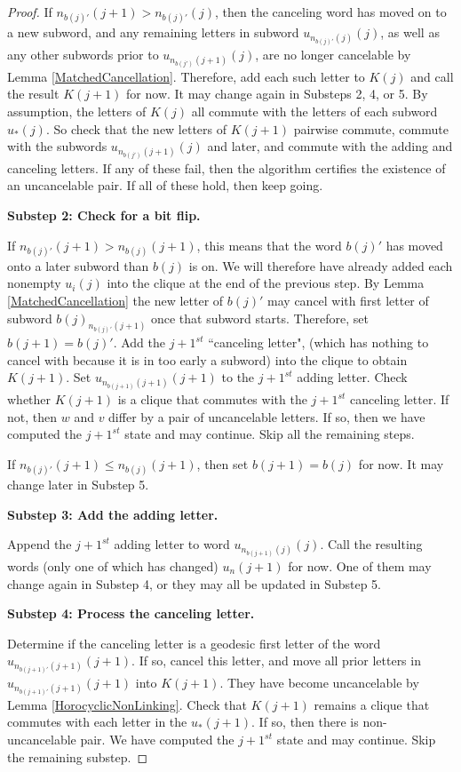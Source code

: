 \documentclass{amsart}
\theoremstyle{definition}
\theoremstyle{remark}
\begin{document}
\begin{proof}
		If $n_{b(j)'}(j+1)>n_{b(j)'}(j)$, then the canceling word has moved on to a new subword, and any remaining letters in subword $u_{n_{b(j)'}(j)}(j)$, as well as any other subwords prior to $u_{n_{b(j')}(j+1)}(j)$, are no longer cancelable by Lemma \ref{MatchedCancellation}. Therefore, add each such letter to $K(j)$ and call the result $K(j+1)$ for now. It may change again in Substeps 2, 4, or 5. By assumption, the letters of $K(j)$ all commute with the letters of each subword $u_{*}(j)$. So check that the new letters of $K(j+1)$ pairwise commute, commute with the subwords $u_{n_{b(j')}(j+1)}(j)$ and later, and commute with the adding and canceling letters. If any of these fail, then the algorithm certifies the existence of an uncancelable pair. If all of these hold, then keep going.
		
		\textbf{Substep 2: Check for a bit flip.}
		
		If $n_{b(j)'}(j+1)>n_{b(j)}(j+1)$, this means that the word $b(j)'$ has moved onto a later subword than $b(j)$ is on. We will therefore have already added each nonempty $u_i(j)$ into the clique at the end of the previous step. By Lemma \ref{MatchedCancellation} the new letter of $b(j)'$ may cancel with first letter of subword ${b(j)}_{n_{b(j)'}(j+1)}$ once that subword starts. Therefore, set $b(j+1)=b(j)'$. Add the $j+1^{st}$ ``canceling letter", (which has nothing to cancel with because it is in too early a subword) into the clique to obtain $K(j+1)$. Set $u_{n_{b(j+1)}(j+1)}(j+1)$ to the $j+1^{st}$ adding letter. Check whether $K(j+1)$ is a clique that commutes with the $j+1^{st}$ canceling letter. If not, then $w$ and $v$ differ by a pair of uncancelable letters. If so, then we have computed the $j+1^{st}$ state and may continue. Skip all the remaining steps.
		
		If $n_{b(j)'}(j+1)\le n_{b(j)}(j+1)$, then set $b(j+1)=b(j)$ for now. It may change later in Substep 5.
		
		\textbf{Substep 3: Add the adding letter.}
		
		Append the $j+1^{st}$ adding letter to word $u_{n_{b(j+1)}(j)}(j)$. Call the resulting words (only one of which has changed) $u_{n}(j+1)$ for now. One of them may change again in Substep 4, or they may all be updated in Substep 5.
		
		\textbf{Substep 4: Process the canceling letter.}
		
		Determine if the canceling letter is a geodesic first letter of the word $u_{n_{b(j+1)'}(j+1)}(j+1)$. If so, cancel this letter, and move all prior letters in $u_{n_{b(j+1)'}(j+1)}(j+1)$ into $K(j+1)$. They have become uncancelable by Lemma \ref{HorocyclicNonLinking}. Check that $K(j+1)$ remains a clique that commutes with each letter in the $u_{*}(j+1)$. If so, then there is non-uncancelable pair. We have computed the $j+1^{st}$ state and may continue. Skip the remaining substep.
		

\end{proof}
\end{document}
